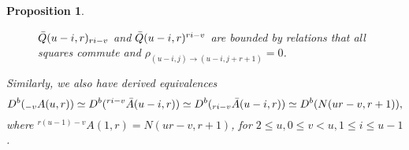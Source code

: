 \documentclass[a4paper, reqno]{amsart}
\newtheorem{prop}[thm]{Proposition}
\theoremstyle{definition}
\theoremstyle{remark}
\numberwithin{equation}{section}
\begin{document}
\begin{prop}
\begin{figure}[H]
\caption{$\Bar{Q}(u-i,r)_{ri-v}$ and $\Bar{Q}(u-i,r)^{ri-v}$ are bounded by relations that all squares commute and $\rho_{(u-i,j)\to(u-i,j+r+1)} = 0$.}\label{xxxx}
\end{figure}
Similarly, we also have derived equivalences 
 $$  D^{b}({_{-v}}A(u,r)) \simeq   D^{b}(^{ri-v}\Bar{A}(u-i,r)) \simeq D^{b}({_{ri-v}}\Bar{A}(u-i,r))\simeq  D^{b}(N(ur-v,r+1)),$$ 
  where  $^{r(u-1)-v}A(1,r)=N(ur-v,r+1)$, for $ 2\leq u, 0\leq v < u, 1\leq i\leq u-1 $ . 
\end{prop}
  
\end{document}
